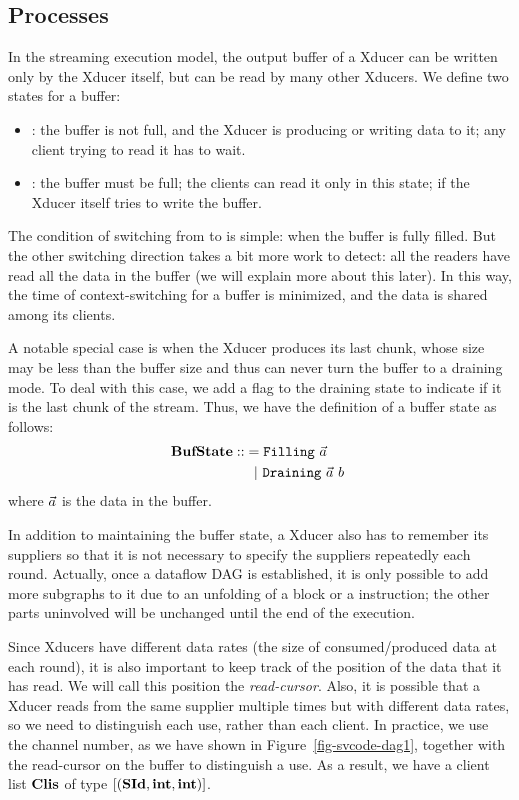 \subsection{Processes}
In the streaming execution model, the output buffer of a Xducer can be written only by the Xducer itself, but can be read by many other Xducers. 
We define two states for a buffer:
\begin{itemize}
	\item {\filling}: the buffer is not full, and the Xducer is producing or writing data to it; any client trying to read it has to wait.

	\item {\draining}: the buffer must be full; the clients can read it only in this state; if the Xducer itself tries to write the buffer.
\end{itemize}

The condition of switching from {\filling} to {\draining} is simple: when the buffer is fully filled. 
But the other switching direction takes a bit more work to detect: all the readers have read all the data in the buffer (we will explain more about this later).
In this way, the time of context-switching for a buffer is minimized, and the data is shared among its clients.


A notable special case is when the Xducer produces its last chunk, whose size may be less than the buffer size and thus can never turn the buffer to a draining mode.
To deal with this case, we add a flag to the draining state to indicate if it is the last chunk of the stream. 
Thus, we have the definition of a buffer state as follows:
\begin{align*}
	\mathbf{BufState} :: & = {\texttt{Filling}} \ \vec a \\
	          & \ \ | \ \texttt{Draining} \ \vec a \ b \
\end{align*}
where $\vec a$ is the data in the buffer.

In addition to maintaining the buffer state, a Xducer also has to remember its suppliers so that it is not necessary to specify the suppliers repeatedly each round. 
Actually, once a dataflow DAG is established, it is only possible to add more subgraphs to it due to an unfolding of a \wc block or a \sc instruction; the other parts uninvolved will be unchanged until the end of the execution.


Since Xducers have different data rates (the size of consumed/produced data at each round), it is also important to keep track of the position of the data that it has read.
We will call this position the \emph{read-cursor}.
Also, it is possible that a Xducer reads from the same supplier multiple times but with different data rates, so we need  to distinguish each use, rather than each client. 
In practice, we use the channel number, as we have shown in Figure~\ref{fig-svcode-dag1}, together with the read-cursor on the buffer to distinguish a use.
As a result, we have a client list $\mathbf{Clis}$ of type $[(\mathbf{SId}, \mathbf{int}, \mathbf{int})]$.

